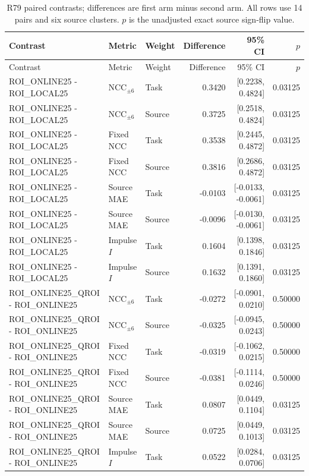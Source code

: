 \begingroup\scriptsize\setlength{\tabcolsep}{2pt}
\begin{longtable}{p{.27\linewidth}p{.13\linewidth}lrrr}
\caption{R79 paired contrasts; differences are first arm minus second arm. All rows use 14 pairs and six source clusters. $p$ is the unadjusted exact source sign-flip value.}\\
\hline
Contrast & Metric & Weight & Difference & 95\% CI & $p$ \\ \hline
\endfirsthead
\hline
Contrast & Metric & Weight & Difference & 95\% CI & $p$ \\ \hline
\endhead
ROI\_ONLINE25 - ROI\_LOCAL25 & NCC$_{\pm6}$ & Task & 0.3420 & [0.2238, 0.4824] & 0.03125 \\
ROI\_ONLINE25 - ROI\_LOCAL25 & NCC$_{\pm6}$ & Source & 0.3725 & [0.2518, 0.4824] & 0.03125 \\
ROI\_ONLINE25 - ROI\_LOCAL25 & Fixed NCC & Task & 0.3538 & [0.2445, 0.4872] & 0.03125 \\
ROI\_ONLINE25 - ROI\_LOCAL25 & Fixed NCC & Source & 0.3816 & [0.2686, 0.4872] & 0.03125 \\
ROI\_ONLINE25 - ROI\_LOCAL25 & Source MAE & Task & -0.0103 & [-0.0133, -0.0061] & 0.03125 \\
ROI\_ONLINE25 - ROI\_LOCAL25 & Source MAE & Source & -0.0096 & [-0.0130, -0.0061] & 0.03125 \\
ROI\_ONLINE25 - ROI\_LOCAL25 & Impulse $I$ & Task & 0.1604 & [0.1398, 0.1846] & 0.03125 \\
ROI\_ONLINE25 - ROI\_LOCAL25 & Impulse $I$ & Source & 0.1632 & [0.1391, 0.1860] & 0.03125 \\
ROI\_ONLINE25\_QROI - ROI\_ONLINE25 & NCC$_{\pm6}$ & Task & -0.0272 & [-0.0901, 0.0210] & 0.50000 \\
ROI\_ONLINE25\_QROI - ROI\_ONLINE25 & NCC$_{\pm6}$ & Source & -0.0325 & [-0.0945, 0.0243] & 0.50000 \\
ROI\_ONLINE25\_QROI - ROI\_ONLINE25 & Fixed NCC & Task & -0.0319 & [-0.1062, 0.0215] & 0.50000 \\
ROI\_ONLINE25\_QROI - ROI\_ONLINE25 & Fixed NCC & Source & -0.0381 & [-0.1114, 0.0246] & 0.50000 \\
ROI\_ONLINE25\_QROI - ROI\_ONLINE25 & Source MAE & Task & 0.0807 & [0.0449, 0.1104] & 0.03125 \\
ROI\_ONLINE25\_QROI - ROI\_ONLINE25 & Source MAE & Source & 0.0725 & [0.0449, 0.1013] & 0.03125 \\
ROI\_ONLINE25\_QROI - ROI\_ONLINE25 & Impulse $I$ & Task & 0.0522 & [0.0284, 0.0706] & 0.03125 \\

\end{longtable}
